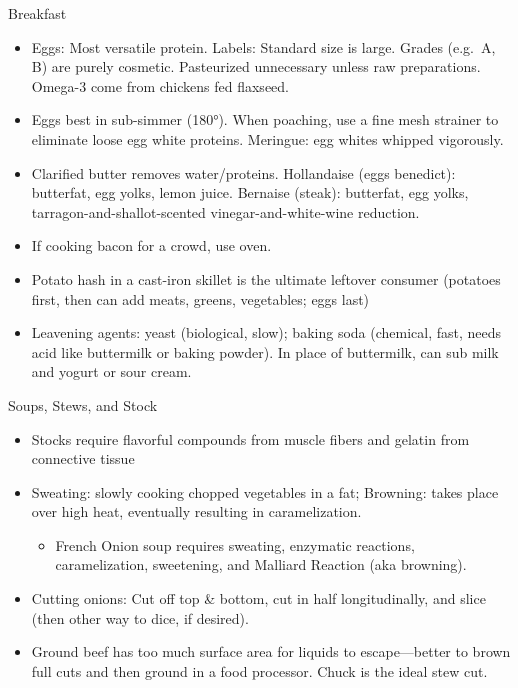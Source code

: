 \documentclass[
]{article}
\providecommand{\tightlist}{%
  \setlength{\itemsep}{0pt}\setlength{\parskip}{0pt}}
\begin{document}
Breakfast

\begin{itemize}
\item
  Eggs: Most versatile protein. Labels: Standard size is large. Grades
  (e.g.~A, B) are purely cosmetic. Pasteurized unnecessary unless raw
  preparations. Omega-3 come from chickens fed flaxseed.
\item
  Eggs best in sub-simmer (180°). When poaching, use a fine mesh
  strainer to eliminate loose egg white proteins. Meringue: egg whites
  whipped vigorously.
\item
  Clarified butter removes water/proteins. Hollandaise (eggs benedict):
  butterfat, egg yolks, lemon juice. Bernaise (steak): butterfat, egg
  yolks, tarragon-and-shallot-scented vinegar-and-white-wine reduction.
\item
  If cooking bacon for a crowd, use oven.
\item
  Potato hash in a cast-iron skillet is the ultimate leftover consumer
  (potatoes first, then can add meats, greens, vegetables; eggs last)
\item
  Leavening agents: yeast (biological, slow); baking soda (chemical,
  fast, needs acid like buttermilk or baking powder). In place of
  buttermilk, can sub milk and yogurt or sour cream.
\end{itemize}

Soups, Stews, and Stock

\begin{itemize}
\item
  Stocks require flavorful compounds from muscle fibers and gelatin from
  connective tissue
\item
  Sweating: slowly cooking chopped vegetables in a fat; Browning: takes
  place over high heat, eventually resulting in caramelization.

  \begin{itemize}
  \tightlist
  \item
    French Onion soup requires sweating, enzymatic reactions,
    caramelization, sweetening, and Malliard Reaction (aka browning).
  \end{itemize}
\item
  Cutting onions: Cut off top \& bottom, cut in half longitudinally, and
  slice (then other way to dice, if desired).
\item
  Ground beef has too much surface area for liquids to escape---better
  to brown full cuts and then ground in a food processor. Chuck is the
  ideal stew cut.
\end{itemize}
\end{document}
